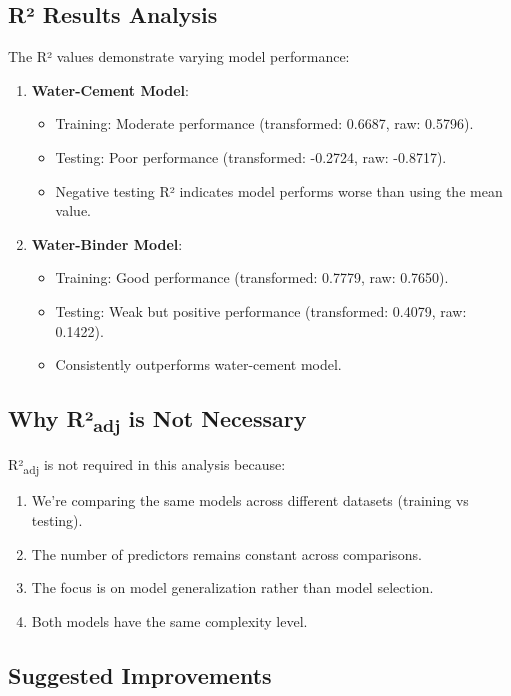 \documentclass[a4paper,11pt]{article}
\begin{document}
\subsection*{R² Results Analysis}

The R² values demonstrate varying model performance:

\begin{enumerate}
    \item \textbf{Water-Cement Model}:
    \begin{itemize}
        \item Training: Moderate performance (transformed: 0.6687, raw: 0.5796).
        \item Testing: Poor performance (transformed: -0.2724, raw: -0.8717).
        \item Negative testing R² indicates model performs worse than using the mean value.
    \end{itemize}

    \item \textbf{Water-Binder Model}:
    \begin{itemize}
        \item Training: Good performance (transformed: 0.7779, raw: 0.7650).
        \item Testing: Weak but positive performance (transformed: 0.4079, raw: 0.1422).
        \item Consistently outperforms water-cement model.
    \end{itemize}
\end{enumerate}

\subsection*{Why R²\textsubscript{adj} is Not Necessary}

R²\textsubscript{adj} is not required in this analysis because:
\begin{enumerate}
    \item We're comparing the same models across different datasets (training vs testing).
    \item The number of predictors remains constant across comparisons.
    \item The focus is on model generalization rather than model selection.
    \item Both models have the same complexity level.
\end{enumerate}

\subsection*{Suggested Improvements}
\end{document}
